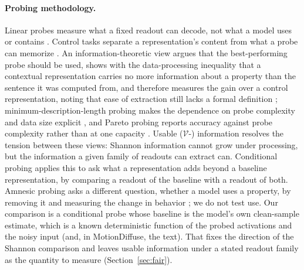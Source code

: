 \paragraph{Probing methodology.}
Linear probes \citep{alain2016understanding} measure what a fixed readout can decode, not what a model uses or contains \citep{belinkov2022probing}. Control tasks separate a representation's content from what a probe can memorize \citep{hewitt2019designing}. An information-theoretic view argues that the best-performing probe should be used, shows with the data-processing inequality that a contextual representation carries no more information about a property than the sentence it was computed from, and therefore measures the gain over a control representation, noting that ease of extraction still lacks a formal definition \citep{pimentel2020information}; minimum-description-length probing makes the dependence on probe complexity and data size explicit \citep{voita2020mdl}, and Pareto probing reports accuracy against probe complexity rather than at one capacity \citep{pimentel2020pareto}. Usable ($\mathcal{V}$-) information \citep{xu2020vinfo} resolves the tension between these views: Shannon information cannot grow under processing, but the information a given family of readouts can extract can. Conditional probing \citep{hewitt2021conditional} applies this to ask what a representation adds beyond a baseline representation, by comparing a readout of the baseline with a readout of both. Amnesic probing asks a different question, whether a model uses a property, by removing it and measuring the change in behavior \citep{elazar2021amnesic}; we do not test use. Our comparison is a conditional probe whose baseline is the model's own clean-sample estimate, which is a known deterministic function of the probed activations and the noisy input (and, in MotionDiffuse, the text). That fixes the direction of the Shannon comparison and leaves usable information under a stated readout family as the quantity to measure (Section~\ref{sec:fair}).
